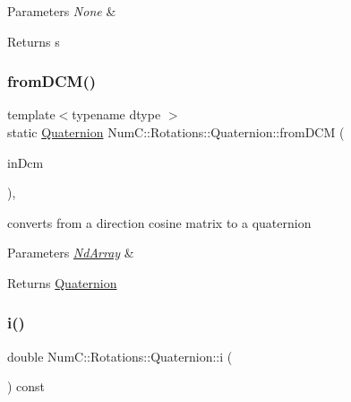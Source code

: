 \begin{DoxyParams}{Parameters}
{\em None} & \\
\hline
\end{DoxyParams}
\begin{DoxyReturn}{Returns}
s 
\end{DoxyReturn}
\mbox{\label{class_num_c_1_1_rotations_1_1_quaternion_a6e66232a5f447ca48e865b2434bd0441}} 
\subsubsection{\texorpdfstring{from\+D\+C\+M()}{fromDCM()}}
{\footnotesize\ttfamily template$<$typename dtype $>$ \\
static \mbox{\hyperlink{class_num_c_1_1_rotations_1_1_quaternion}{Quaternion}} Num\+C\+::\+Rotations\+::\+Quaternion\+::from\+D\+CM (\begin{DoxyParamCaption}\item[{const \mbox{\hyperlink{class_num_c_1_1_nd_array}{Nd\+Array}}$<$ dtype $>$ \&}]{in\+Dcm }\end{DoxyParamCaption})\hspace{0.3cm}{\ttfamily [inline]}, {\ttfamily [static]}}

converts from a direction cosine matrix to a quaternion


\begin{DoxyParams}{Parameters}
{\em \mbox{\hyperlink{class_num_c_1_1_nd_array}{Nd\+Array}}} & \\
\hline
\end{DoxyParams}
\begin{DoxyReturn}{Returns}
\mbox{\hyperlink{class_num_c_1_1_rotations_1_1_quaternion}{Quaternion}} 
\end{DoxyReturn}
\mbox{\label{class_num_c_1_1_rotations_1_1_quaternion_aec704993b1650cb91b50090d0f0822a4}} 
\subsubsection{\texorpdfstring{i()}{i()}}
{\footnotesize\ttfamily double Num\+C\+::\+Rotations\+::\+Quaternion\+::i (\begin{DoxyParamCaption}{ }\end{DoxyParamCaption}) const\hspace{0.3cm}{\ttfamily [inline]}}

